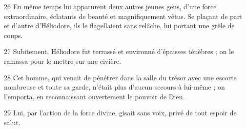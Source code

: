 
26 En même temps lui apparurent deux autres jeunes gens, d’une force extraordinaire, éclatants de beauté et magnifiquement vêtus. Se plaçant de part et d’autre d’Héliodore, ils le flagellaient sans relâche, lui portant une grêle de coups.

27 Subitement, Héliodore fut terrassé et environné d’épaisses ténèbres ; on le ramassa pour le mettre sur une civière.

28 Cet homme, qui venait de pénétrer dans la salle du trésor avec une escorte nombreuse et toute sa garde, n’était plus d’aucun secours à lui-même ; on l’emporta, en reconnaissant ouvertement le pouvoir de Dieu.

29 Lui, par l’action de la force divine, gisait sans voix, privé de tout espoir de salut.